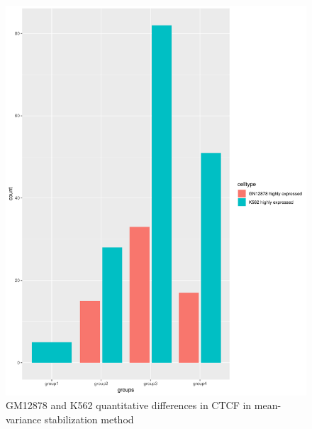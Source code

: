 \documentclass[11pt,letterpaper]{article}
\begin{document}
\begin{figure}[H]
	\begin{center}
		\includegraphics[scale=.3]{MV-CTCF-GM12878-K562.PDF}
		\vspace*{8pt}
		\caption{GM12878 and K562 quantitative differences in CTCF in mean-variance stabilization method}
		\label{fig:go2}
		
	\end{center}
\end{figure}
\end{document}
